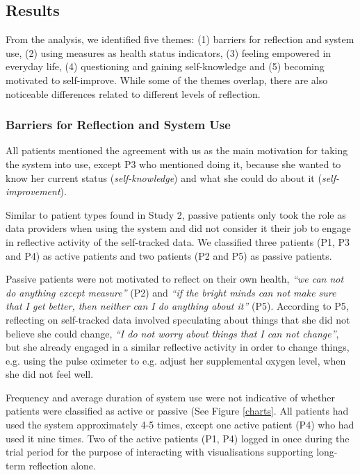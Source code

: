 \subsection{Results}
From the analysis, we identified five themes: (1) barriers for reflection and system use, (2) using measures as health status indicators, (3) feeling empowered in everyday life, (4) questioning and gaining self-knowledge and (5) becoming motivated to self-improve. While some of the themes overlap, there are also noticeable differences related to different levels of reflection. 

\subsubsection{Barriers for Reflection and System Use}
All patients mentioned the agreement with us as the main motivation for taking the system into use, except P3 who mentioned doing it, because she wanted to know her current status (\textit{self-knowledge}) and what she could do about it (\textit{self-improvement}). 

Similar to patient types found in Study 2, passive patients only took the role as data providers when using the system and did not consider it their job to engage in reflective activity of the self-tracked data. We classified three patients (P1, P3 and P4) as active patients and two patients (P2 and P5) as passive patients. 

Passive patients were not motivated to reflect on their own health, \textit{“we can not do anything except measure”} (P2) and \textit{“if the bright minds can not make sure that I get better, then neither can I do anything about it”} (P5). According to P5, reflecting on self-tracked data involved speculating about things that she did not believe she could change, \textit{“I do not worry about things that I can not change”}, but she already engaged in a similar reflective activity in order to change things, e.g. using the pulse oximeter to e.g. adjust her supplemental oxygen level, when she did not feel well.

Frequency and average duration of system use were not indicative of whether patients were classified as active or passive (See Figure \ref{charts}. All patients had used the system approximately 4-5 times, except one active patient (P4) who had used it nine times. Two of the active patients (P1, P4) logged in once during the trial period for the purpose of interacting with visualisations supporting long-term reflection alone. 

